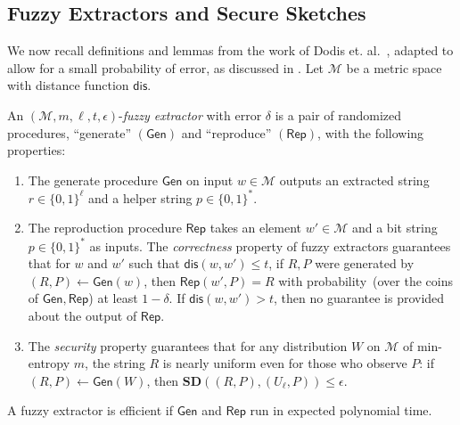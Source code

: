 \documentclass{llncs}
\newcommand{\class}[1]{{\ensuremath{\mathsf{#1}}}}
\newcommand{\gen}{\ensuremath{\class{Gen}}\xspace}
\newcommand{\rep}{\ensuremath{\class{Rep}}\xspace}
\newcommand{\dis}{\ensuremath{\mathsf{dis}}}
\begin{document}
\subsection{Fuzzy Extractors and Secure Sketches}
\label{sec:fuzzy extractors}

We now recall definitions and lemmas from the work of Dodis et. al.~\cite[Sections 2.5--4.1]{DBLP:journals/siamcomp/DodisORS08}, adapted to allow for a small probability of error, as discussed in \cite[Sections 8]{DBLP:journals/siamcomp/DodisORS08}.  Let $\mathcal{M}$ be a metric space with distance function $\dis$.

\begin{definition}
\label{def:fuzzy extractor}
An $(\mathcal{M}, m, \ell, t, \epsilon)$-\emph{fuzzy extractor} with error $\delta$ is a pair of randomized procedures, ``generate'' $(\gen)$ and ``reproduce'' $(\rep)$, with the following properties: 
\begin{enumerate}
\item The generate procedure \gen on input $w\in \mathcal{M}$ outputs an extracted string $r\in\{0,1\}^\ell$ and a helper string $p\in\{0,1\}^*$.
\item The reproduction procedure \rep takes an element $w'\in \mathcal{M}$ and a bit string $p\in\{0,1\}^*$ as inputs.  The \emph{correctness} property of fuzzy extractors guarantees that for $w$ and $w'$ such that $\dis(w,w')\leq t$, if $R,P$ were generated by $(R,P)\leftarrow\gen(w)$, then $\rep(w',P)=R$ with probability~(over the coins of $\gen, \rep$) at least $1-\delta$.  If $\dis(w,w')>t$, then no guarantee is provided about the output of \rep.
\item The \emph{security} property guarantees that for any distribution $W$ on $\mathcal{M}$ of min-entropy $m$, the string $R$ is nearly uniform even for those who observe $P$:  if $(R,P)\leftarrow\gen (W)$, then $\mathbf{SD}((R,P),(U_\ell,P))\leq \epsilon$.
\end{enumerate}
A fuzzy extractor is efficient if $\gen$ and $\rep$ run in expected polynomial time.
\end{definition}
\end{document}
